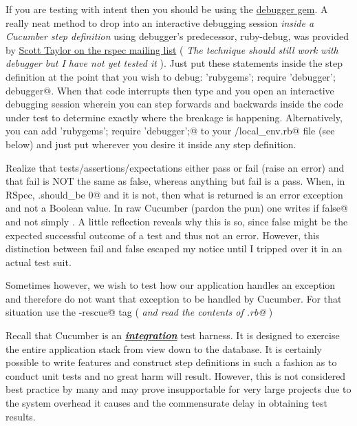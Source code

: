 \documentclass[10pt]{book}
\begin{document}
If you are testing with intent then you should be using the \href{http://rubygems.org/gems/debugger/}{debugger gem}.  A really neat method to drop into an interactive debugging session \emph{inside a Cucumber step definition} using debugger's predecessor, ruby-debug, was provided by \href{http://www.ruby-forum.com/topic/175732#769713}{Scott Taylor on the rspec mailing list} ( \emph{The technique should still work with debugger but I have not yet tested it} ).  Just put these statements inside the step definition at the point that you wish to debug:  \verb@require 'rubygems'; require 'debugger'; debugger@.  When that code interrupts then type \verb@irb@ and you open an interactive debugging session wherein you can step forwards and backwards inside the code under test to determine exactly where the breakage is happening.  Alternatively, you can add \verb@require 'rubygems'; require 'debugger';@ to your \verb@support/local_env.rb@ file (see below) and just put \verb@debugger@ wherever you desire it inside any step definition.

Realize that tests/assertions/expectations either pass or fail (raise an error) and that fail is NOT the same as false, whereas anything but fail is a pass.  When, in RSpec, \verb@something.should_be 0@ and it is not, then what is returned is an error exception and not a Boolean value.  In raw Cucumber (pardon the pun) one writes \verb@fail if false@ and not simply \verb@false@.  A little reflection reveals why this is so, since false might be the expected successful outcome of a test and thus not an error.  However, this distinction between fail and false escaped my notice until I tripped over it in an actual test suit.

Sometimes however, we wish to test how our application handles an exception and therefore do not want that exception to be handled by Cucumber.  For that situation use the \verb@@allow-rescue@ tag ( \emph{and read the contents of \verb@env.rb@} )

Recall that Cucumber is an \textbf{\emph{\href{http://en.wikipedia.org/wiki/Integration_testing}{integration}}} test harness.  It is designed to exercise the entire application stack from view down to the database.  It is certainly possible to write features and construct step definitions in such a fashion as to conduct unit tests and no great harm will result.  However, this is not considered best practice by many and may prove insupportable for very large projects due to the system overhead it causes and the commensurate delay in obtaining test results.
\end{document}
